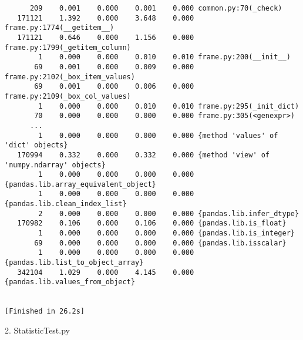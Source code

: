 \documentclass{article}
\begin{document}
\begin{verbatim}
      209    0.001    0.000    0.001    0.000 common.py:70(_check)
   171121    1.392    0.000    3.648    0.000 frame.py:1774(__getitem__)
   171121    0.646    0.000    1.156    0.000 frame.py:1799(_getitem_column)
        1    0.000    0.000    0.010    0.010 frame.py:200(__init__)
       69    0.001    0.000    0.009    0.000 frame.py:2102(_box_item_values)
       69    0.001    0.000    0.006    0.000 frame.py:2109(_box_col_values)
        1    0.000    0.000    0.010    0.010 frame.py:295(_init_dict)
       70    0.000    0.000    0.000    0.000 frame.py:305(<genexpr>)
      ...
        1    0.000    0.000    0.000    0.000 {method 'values' of 'dict' objects}
   170994    0.332    0.000    0.332    0.000 {method 'view' of 'numpy.ndarray' objects}
        1    0.000    0.000    0.000    0.000 {pandas.lib.array_equivalent_object}
        1    0.000    0.000    0.000    0.000 {pandas.lib.clean_index_list}
        2    0.000    0.000    0.000    0.000 {pandas.lib.infer_dtype}
   170982    0.106    0.000    0.106    0.000 {pandas.lib.is_float}
        1    0.000    0.000    0.000    0.000 {pandas.lib.is_integer}
       69    0.000    0.000    0.000    0.000 {pandas.lib.isscalar}
        1    0.000    0.000    0.000    0.000 {pandas.lib.list_to_object_array}
   342104    1.029    0.000    4.145    0.000 {pandas.lib.values_from_object}


[Finished in 26.2s]
\end{verbatim}
2. StatisticTest.py
\begin{verbatim}

\end{verbatim}
\end{document}
